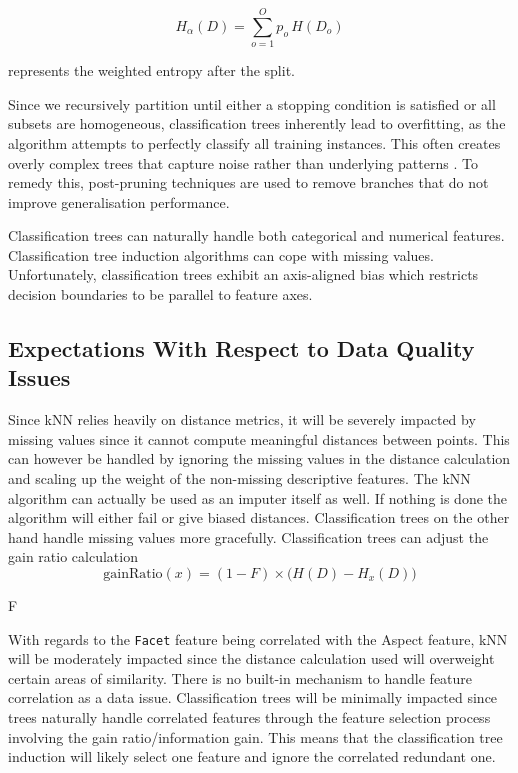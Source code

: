 \documentclass[10pt, conference]{IEEEtran}
\begin{document}
\[
H_\alpha(D) = \sum_{o=1}^{O} p_o \, H(D_o)
\]

represents the weighted entropy after the split.

Since we recursively partition until either a stopping condition is satisfied or all subsets are homogeneous, classification trees inherently lead to overfitting, as the algorithm attempts to perfectly classify all training instances. This often creates overly complex trees that capture noise rather than underlying patterns \cite{quinlan1993c45}. To remedy this, post-pruning techniques are used to remove branches that do not improve generalisation performance.

Classification trees can naturally handle both categorical and numerical features. Classification tree induction algorithms can cope with missing values. Unfortunately, classification trees exhibit an axis-aligned bias which restricts decision boundaries to be parallel to feature axes.

\subsection{Expectations With Respect to Data Quality Issues}
Since kNN relies heavily on distance metrics, it will be severely impacted by missing values since it cannot compute meaningful distances between points. This can however be handled by ignoring the missing values in the distance calculation and scaling up the weight of the non-missing descriptive features. The kNN algorithm can actually be used as an imputer itself as well. If nothing is done the algorithm will either fail or give biased distances. Classification trees on the other hand handle missing values more gracefully. Classification trees can adjust the gain ratio calculation 
\[
\text{gainRatio}(x) = (1 - F) \times \big( H(D) - H_x(D) \big)
\]

 F 



With regards to the \texttt{Facet} feature being correlated with the Aspect feature, kNN will be moderately impacted since the distance calculation used will overweight certain areas of similarity. There is no built-in mechanism to handle feature correlation as a data issue. Classification trees will be minimally impacted since trees naturally handle correlated features through the feature selection process involving the gain ratio/information gain. This means that the classification tree induction will likely select one feature and ignore the correlated redundant one.
\end{document}
